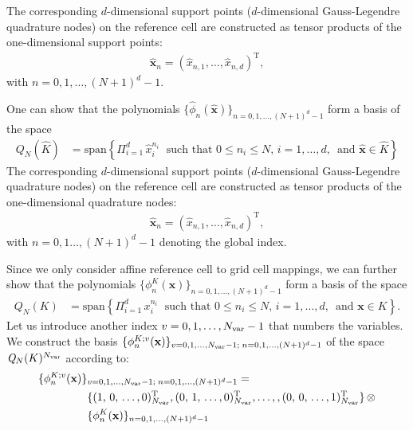 \documentclass{scrreprt}
\theoremstyle{definition}
\theoremstyle{nonumberplain}
\renewcommand{\vec}[1]{{\textbf{#1}}}
\newcommand{\transp}{^\textrm{T}}
\newcommand{\cell}{K}
\newcommand{\refVec}[1]{\hat{\vec{#1}}}
\newcommand{\refCell}{\hat{\cell}}
\newcommand{\polyspace}[3]{\mathit{#1}_{#2}(#3)}
\begin{document}
The corresponding $d$-dimensional support points ($d$-dimensional
Gauss-Legendre quadrature nodes) on the reference cell are constructed as tensor
products of the one-dimensional support points:
\begin{align*}
\refVec{x}_n = (\hat{x}_{n,1},\ldots,\hat{x}_{n,d})\transp,
\end{align*}
with $n=0,1,\ldots,(N+1)^{d}-1$.

One can show that the polynomials $\{\hat{\phi}_n
(\refVec{x})\}_{n=0,1,\ldots,(N+1)^d-1}$ form a basis of the space
\begin{align*}
\polyspace{Q}{N}{\refCell} &= \text{span}\left\{ \Pi_{i=1}^d\,
\hat{x}_i^{n_i}\; \text{ such that }
0 \leq n_i \leq N,\,i=1,\ldots,d,\, \text{ and } \refVec{x} \in \refCell
\right\}
\end{align*}
The corresponding $d$-dimensional support points ($d$-dimensional
Gauss-Legendre quadrature nodes) on the reference cell are constructed as tensor
products of the one-dimensional quadrature nodes:
\begin{align*}
\refVec{x}_n = (\hat{x}_{n,1},\ldots,\hat{x}_{n,d})\transp,
\end{align*}
with $n=0,1\ldots,(N+1)^d-1$ denoting the global index.

Since we only consider affine reference cell to grid cell mappings, we can
further show that the polynomials $\{{\phi}^K_n
(\vec{x})\}_{n=0,1,\ldots,(N+1)^d-1}$ form a basis of the space
\begin{align*}
\polyspace{Q}{N}{\cell} &= \text{span}\left\{ \Pi_{i=1}^d\,
x_i^{n_i}\; \text{ such that }
0 \leq n_i \leq N,\,i=1,\ldots,d,\, \text{ and } \vec{x} \in \cell
\right\}.
\end{align*}
Let us introduce another index $v=0,1,\ldots,N_\textup{var}-1$
that numbers the variables.
We construct the basis $\{{\phi}^{K;v}_n
(\vec{x})\}_{v=0,1,\ldots,N_\textup{var}-1;\;n=0,1,\ldots,(N+1)^d-1}$
of the space
$\polyspace{Q}{N}{\cell}^{N_\textup{var}}$ according to:
\begin{align*}
\{{\phi}^{K;v}_n
(\vec{x})\}&_{v=0,1,\ldots,N_\textup{var}-1;\;n=0,1,\ldots,(N+1)^d-1}
= \\
&\lbrace
(
1,\,
0,\,
\ldots,
0
)_{N_\textup{var}}\transp
,
(
0,\,
1,\,
\ldots,
0
)_{N_\textup{var}}\transp
,
\ldots,
,
(
0,\,
0,\,
\ldots,
1
)_{N_\textup{var}}\transp
\rbrace
\,\otimes
\\
&\{{\phi}^K_n
(\vec{x})\}_{n=0,1,\ldots,(N+1)^d-1}
\end{align*}
\end{document}
